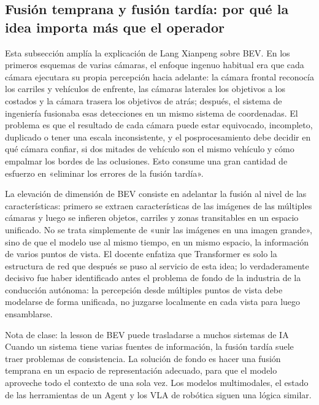 \subsection{Fusión temprana y fusión tardía: por qué la idea importa más que el operador}

Esta subsección amplía la explicación de Lang Xianpeng sobre BEV. En los primeros esquemas de varias cámaras, el enfoque ingenuo habitual era que cada cámara ejecutara su propia percepción hacia adelante: la cámara frontal reconocía los carriles y vehículos de enfrente, las cámaras laterales los objetivos a los costados y la cámara trasera los objetivos de atrás; después, el sistema de ingeniería fusionaba esas detecciones en un mismo sistema de coordenadas. El problema es que el resultado de cada cámara puede estar equivocado, incompleto, duplicado o tener una escala inconsistente, y el posprocesamiento debe decidir en qué cámara confiar, si dos mitades de vehículo son el mismo vehículo y cómo empalmar los bordes de las oclusiones. Esto consume una gran cantidad de esfuerzo en «eliminar los errores de la fusión tardía».

La elevación de dimensión de BEV consiste en adelantar la fusión al nivel de las características: primero se extraen características de las imágenes de las múltiples cámaras y luego se infieren objetos, carriles y zonas transitables en un espacio unificado. No se trata simplemente de «unir las imágenes en una imagen grande», sino de que el modelo use al mismo tiempo, en un mismo espacio, la información de varios puntos de vista. El docente enfatiza que Transformer es solo la estructura de red que después se puso al servicio de esta idea; lo verdaderamente decisivo fue haber identificado antes el problema de fondo de la industria de la conducción autónoma: la percepción desde múltiples puntos de vista debe modelarse de forma unificada, no juzgarse localmente en cada vista para luego ensamblarse.

\begin{knowledgebox}{Nota de clase: la lesson de BEV puede trasladarse a muchos sistemas de IA}
Cuando un sistema tiene varias fuentes de información, la fusión tardía suele traer problemas de consistencia. La solución de fondo es hacer una fusión temprana en un espacio de representación adecuado, para que el modelo aproveche todo el contexto de una sola vez. Los modelos multimodales, el estado de las herramientas de un Agent y los VLA de robótica siguen una lógica similar.
\end{knowledgebox}

